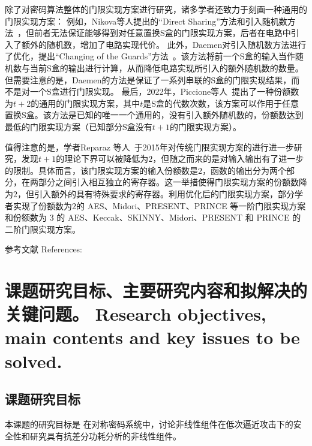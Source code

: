 \documentclass[a4paper,zihao=-4,AutoFakeBold]{ctexart}
\begin{document}
除了对密码算法整体的门限实现方案进行研究，诸多学者还致力于刻画一种通用的门限实现方案：
例如，Nikova等人提出的``Direct Sharing''方法和引入随机数方法~\cite{NikovaRSJoC11}，但前者无法保证能够得到对任意置换S盒的门限实现方案，后者在电路中引入了额外的随机数，增加了电路实现代价。
此外，Daemen对引入随机数方法进行了优化，提出``Changing of the Guards''方法~\cite{DaemenCHES17}。该方法将前一个S盒的输入当作随机数与当前S盒的输出进行计算，从而降低电路实现所引入的额外随机数的数量。但需要注意的是，Daemen的方法是保证了一系列串联的S盒的门限实现结果，而不是对一个S盒进行门限实现。
最后，2022年，Piccione等人~\cite{Piccione23TI_tp2}提出了一种份额数为$t+2$的通用的门限实现方案，其中$t$是S盒的代数次数，该方案可以作用于任意置换S盒。该方法是已知的唯一一个通用的，没有引入额外随机数的，份额数达到最低的门限实现方案（已知部分S盒没有$t+1$的门限实现方案）。

值得注意的是，学者Reparaz 等人~\cite{Reparaz15}于2015年对传统门限实现方案的进行进一步研究，发现$t+1$的理论下界可以被降低为$2$，但随之而来的是对输入输出有了进一步的限制。具体而言，该门限实现方案的输入份额数是$2$，函数的输出分为两个部分，在两部分之间引入相互独立的寄存器。这一举措使得门限实现方案的份额数降为$2$，但引入额外的具有特殊要求的寄存器。利用优化后的门限实现方案，部分学者实现了份额数为$2$的 AES、Midori、PRESENT、PRINCE 等一阶门限实现方案和份额数为 3 的 AES、Keccak、SKINNY、Midori、PRESENT 和 PRINCE 的二阶门限实现方案。

\vspace{2\baselineskip}
{
    \linespread{1.25}\selectfont%
    参考文献 References:
    \printbibliography[heading=none]
}


\section{课题研究目标、主要研究内容和拟解决的关键问题。
  Research objectives, main contents and key issues to be solved.}
\subsection{课题研究目标}
本课题的研究目标是
在对称密码系统中，讨论非线性组件在低次逼近攻击下的安全性和研究具有抗差分功耗分析的非线性组件。

\end{document}
